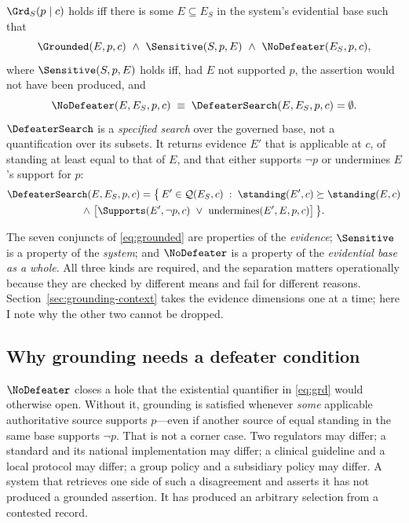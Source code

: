 \begin{definition}
\label{def:grounding}
$\Grd_S(p \mid c)$ holds iff there is some $E \subseteq E_S$ in the system's
evidential base such that
\begin{equation}
  \Grounded(E, p, c) \ \wedge\ \Sensitive(S, p, E) \ \wedge\ \NoDefeater(E_S, p, c),
  \label{eq:grd}
\end{equation}
where $\Sensitive(S, p, E)$ holds iff, had $E$ not supported $p$, the assertion would
not have been produced, and
\begin{equation}
  \NoDefeater(E, E_S, p, c) \;\equiv\; \DefeaterSearch(E, E_S, p, c) = \emptyset .
  \label{eq:nodefeater}
\end{equation}
$\DefeaterSearch$ is a \emph{specified search} over the governed base, not a
quantification over its subsets. It returns evidence $E'$ that is applicable at $c$, of
standing at least equal to that of $E$, and that either supports $\neg p$ or undermines
$E$'s support for $p$:
\begin{multline}
  \DefeaterSearch(E, E_S, p, c) = \bigl\{\, E' \in \mathcal{Q}(E_S, c) \;:\;
    \standing(E', c) \succeq \standing(E, c)\\
    \wedge\ \bigl[\Supports(E', \neg p, c)
      \ \vee\ \text{undermines}(E', E, p, c)\bigr] \,\bigr\}.
  \label{eq:defeatersearch}
\end{multline}
\end{definition}

The seven conjuncts of \eqref{eq:grounded} are properties of the \emph{evidence};
$\Sensitive$ is a property of the \emph{system}; and $\NoDefeater$ is a property of
the \emph{evidential base as a whole}. All three kinds are required, and the
separation matters operationally because they are checked by different means and fail
for different reasons. Section~\ref{sec:grounding-context} takes the evidence
dimensions one at a time; here I note why the other two cannot be dropped.

\subsection{Why grounding needs a defeater condition}
\label{sec:why-defeater}

$\NoDefeater$ closes a hole that the existential quantifier in \eqref{eq:grd} would
otherwise open. Without it, grounding is satisfied whenever \emph{some} applicable
authoritative source supports $p$---even if another source of equal standing in the same
base supports $\neg p$. That is not a corner case. Two regulators may differ; a standard
and its national implementation may differ; a clinical guideline and a local protocol
may differ; a group policy and a subsidiary policy may differ. A system that retrieves
one side of such a disagreement and asserts it has not produced a grounded assertion. It
has produced an arbitrary selection from a contested record.

